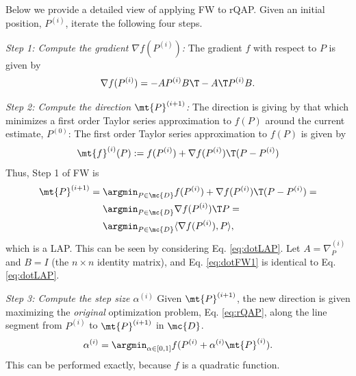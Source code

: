 \documentclass[10pt,journal,cspaper,compsoc]{IEEEtran}
\begin{document}
Below we provide a detailed view of applying FW to rQAP.  Given an initial position, $P^{(i)}$, iterate the following four steps.

\emph{Step 1: Compute the gradient $\nabla f(P^{(i)})$:}  The gradient $f$ with respect to $P$ is given by
\begin{align} \label{eq:grad}
	\nabla f (P^{(i)}) = 
	  - A P^{(i)} B\T - A\T P^{(i)} B.
\end{align}


\emph{Step 2: Compute the direction $\mt{P}^{(i+1)}$:} The direction is giving by that which minimizes a first order Taylor series approximation to $f(P)$ around the current estimate, $P^{(0)}$: The first order Taylor series approximation to $f(P)$ is given by
\begin{align}
	\mt{f}^{(i)}(P) := f(P^{(i)}) + \nabla f(P^{(i)})\T(P - P^{(i)})
\end{align}
Thus, Step 1 of FW is
\begin{subequations} \label{eq:FW1}
\begin{align}
	\mt{P}^{(i+1)} = \argmin_{P \in \mc{D}} &f(P^{(i)}) + \nabla f(P^{(i)})\T(P - P^{(i)}) 
	=\\ \argmin_{P \in \mc{D}} &\nabla f(P^{(i)})\T P 
	= \\ \argmin_{P \in \mc{D}} & \langle \nabla f(P^{(i)}), P \rangle, \label{eq:dotFW1}
\end{align}
\end{subequations}
which is a LAP.  This can be seen by considering Eq. \eqref{eq:dotLAP}.  Let $A=\nabla_P^{(i)}$ and $B=I$ (the $n\times n$ identity matrix), and Eq. \eqref{eq:dotFW1} is identical to Eq. \eqref{eq:dotLAP}.


\emph{Step 3: Compute the step size $\alpha^{(i)}$} Given $\mt{P}^{(i+1)}$, the new direction is given maximizing the \emph{original} optimization problem, Eq. \eqref{eq:rQAP}, along the line segment from $P^{(i)}$ to $\mt{P}^{(i+1)}$ in $\mc{D}$.    
% 
% 
% 
\begin{align}\label{eq:step}
	\alpha^{(i)} = \argmin_{\alpha \in [0,1]} f(P^{(i)} + \alpha^{(i)} \mt{P}^{(i)}).
\end{align}
This can be performed exactly, because $f$ is a quadratic function.  
\end{document}
